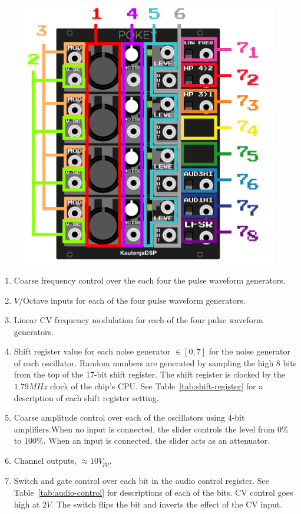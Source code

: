 \documentclass[12pt,letter]{article}
\begin{document}
\begin{figure}[!htp]
\centering
\includegraphics{Potillator-Manual}
\end{figure}

\begin{enumerate}
  \item Coarse frequency control over the each four the pulse waveform generators.
  \item $V$/Octave inputs for each of the four pulse waveform generators.
  \item Linear CV frequency modulation for each of the four pulse waveform generators.
  \item Shift register value for each noise generator $\in [0, 7]$ for the noise generator of each oscillator. Random numbers are generated by sampling the high 8 bits from the top of the 17-bit shift register. The shift register is clocked by the $1.79MHz$ clock of the chip's CPU. See Table~\ref{tab:shift-register} for a description of each shift register setting.
  \item Coarse amplitude control over each of the oscillators using 4-bit amplifiers.When no input is connected, the slider controls the level from $0\%$ to $100\%$. When an input is connected, the slider acts as an attenuator.
  \item Channel outputs, ${\approx}10V_{pp}$.
  \item Switch and gate control over each bit in the audio control register. See Table~\ref{tab:audio-control} for descriptions of each of the bits. CV control goes high at $2V$. The switch flips the bit and inverts the effect of the CV input.
\end{enumerate}
\end{document}
